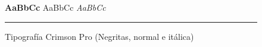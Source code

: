 \vspace{1em}
\begin{figure}[H]
    \centering
    {\LARGE\selectfont \textbf{AaBbCc} \quad  AaBbCc \quad \textit{AaBbCc}}
    \vspace{1em}
    \textcolor{DarkBlue}{\rule{\linewidth}{0.2pt}}
    \vspace*{-2em}
    \caption{Tipografía Crimson Pro (Negritas, normal e itálica)}
    \label{fig:tipografía_crimson_pro}
\end{figure}